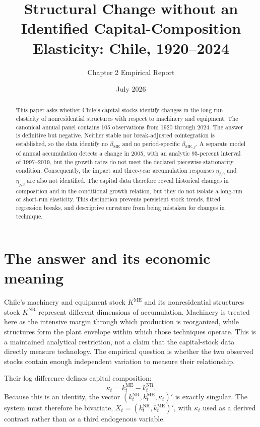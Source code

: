 \documentclass[11pt,a4paper]{article}
\title{\textbf{Structural Change without an Identified
Capital-Composition Elasticity: Chile, 1920--2024}}
\author{Chapter 2 Empirical Report}
\date{July 2026}
\begin{document}
\maketitle

\begin{abstract}
This paper asks whether Chile's capital stocks identify changes in the
long-run elasticity of nonresidential structures with respect to machinery
and equipment. The canonical annual panel contains 105 observations from
1920 through 2024. The answer is definitive but negative. Neither stable nor
break-adjusted cointegration is established, so the data identify no
\(\beta_{\mathrm{ME}}\) and no period-specific
\(\beta_{\mathrm{ME},j}\). A separate model of annual accumulation detects a
change in 2005, with an analytic 95-percent interval of 1997--2019, but the
growth rates do not meet the declared piecewise-stationarity condition.
Consequently, the impact and three-year accumulation responses
\(\eta_{j,0}\) and \(\eta_{j,3}\) are also not identified. The capital data
therefore reveal historical changes in composition and in the conditional
growth relation, but they do not isolate a long-run or short-run elasticity.
This distinction prevents persistent stock trends, fitted regression breaks,
and descriptive curvature from being mistaken for changes in technique.
\end{abstract}

\FloatBarrier
\section{The answer and its economic meaning}

Chile's machinery and equipment stock \(K^{\mathrm{ME}}\) and its
nonresidential structures stock \(K^{\mathrm{NR}}\) represent different
dimensions of accumulation. Machinery is treated here as the intensive
margin through which production is reorganized, while structures form the
plant envelope within which those techniques operate. This is a maintained
analytical restriction, not a claim that the capital-stock data directly
measure technology. The empirical question is whether the two observed
stocks contain enough independent variation to measure their relationship.

Their log difference defines capital composition:
\begin{equation}
  \kappa_t=k_t^{\mathrm{ME}}-k_t^{\mathrm{NR}}.
  \label{eq:kappa}
\end{equation}
Because this is an identity, the vector
\((k_t^{\mathrm{NR}},k_t^{\mathrm{ME}},\kappa_t)'\) is exactly singular.
The system must therefore be bivariate,
\(X_t=(k_t^{\mathrm{NR}},k_t^{\mathrm{ME}})'\), with \(\kappa_t\) used as
a derived contrast rather than as a third endogenous variable.
\end{document}
